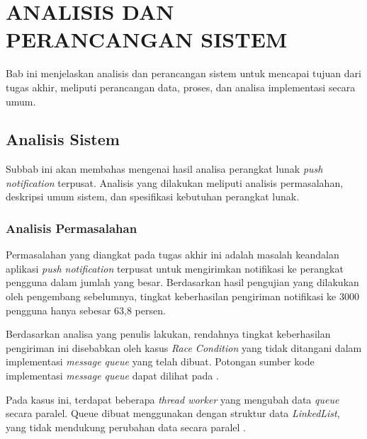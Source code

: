 \chapter{ANALISIS DAN PERANCANGAN SISTEM}
Bab ini menjelaskan analisis dan perancangan sistem untuk mencapai tujuan dari tugas akhir, meliputi perancangan data, proses, dan analisa implementasi secara umum.

\section{Analisis Sistem}
Subbab ini akan membahas mengenai hasil analisa perangkat lunak \textit{push notification} terpusat.
Analisis yang dilakukan meliputi analisis permasalahan, deskripsi umum sistem, dan spesifikasi kebutuhan perangkat lunak.

\subsection{Analisis Permasalahan}
\par Permasalahan yang diangkat pada tugas akhir ini adalah masalah keandalan aplikasi \textit{push notification} terpusat untuk mengirimkan notifikasi ke perangkat pengguna dalam jumlah yang besar. Berdasarkan hasil pengujian yang dilakukan oleh pengembang sebelumnya, tingkat keberhasilan pengiriman notifikasi ke 3000 pengguna hanya sebesar 63,8 persen.
\par Berdasarkan analisa yang penulis lakukan, rendahnya tingkat keberhasilan pengiriman ini disebabkan oleh kasus \textit{Race Condition} yang tidak ditangani dalam implementasi \textit{message queue} yang telah dibuat. Potongan sumber kode implementasi \textit{message queue} dapat dilihat pada .
\par Pada kasus ini, terdapat beberapa \textit{thread worker} yang mengubah data \textit{queue} secara paralel. Queue dibuat menggunakan dengan struktur data \textit{LinkedList}, yang tidak mendukung perubahan data secara paralel \cite{linkedlist-online}.

